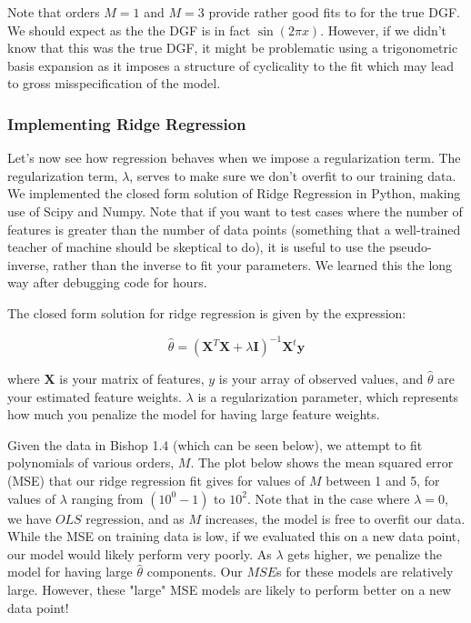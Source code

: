 \documentclass[10pt]{article}
\begin{document}
Note that orders $M=1$ and $M=3$ provide rather good fits to for the true DGF. We should expect as the the DGF is in fact $\sin(2\pi x)$. However, if we didn't know that this was the true DGF, it might be problematic using a trigonometric basis expansion as it imposes a structure of cyclicality to the fit which may lead to gross misspecification of the model.

\subsubsection*{Implementing Ridge Regression}

Let's now see how regression behaves when we impose a regularization term. The regularization term, $\lambda$, serves to make sure we don't overfit to our training data. We implemented the closed form solution of Ridge Regression in Python, making use of Scipy and Numpy. Note that if you want to test cases where the number of features is greater than the number of data points (something that a well-trained teacher of machine should be skeptical to do), it is useful to use the pseudo-inverse, rather than the inverse to fit your parameters. We learned this the long way after debugging code for hours.

The closed form solution for ridge regression is given by the expression:

\begin{equation}
\hat{\theta} = (\mathbf{X}^T\mathbf{X} + \lambda \mathbf{I})^{-1}\mathbf{X}^t\mathbf{y}
\end{equation}

\noindent where $\mathbf{X}$ is your matrix of features, $y$ is your array of observed values, and $\hat{\theta}$ are your estimated feature weights. $\lambda$ is a regularization parameter, which represents how much you penalize the model for having large feature weights.

Given the data in Bishop 1.4 (which can be seen below), we attempt to fit polynomials of various orders, $M$.  The plot below shows the mean squared error (MSE) that our ridge regression fit gives for values of $M$ between 1 and 5, for values of $\lambda$ ranging from $(10^0 -1)$ to $10^2$. Note that in the case where $\lambda = 0$, we have $OLS$ regression, and as $M$ increases, the model is free to overfit our data. While the MSE on training data is low, if we evaluated this on a new data point, our model would likely perform very poorly. As $\lambda$ gets higher, we penalize the model for having large $\hat{\theta}$ components. Our $MSE$s for these models are relatively large. However, these "large" MSE models are likely to perform better on a new data point!
\end{document}
